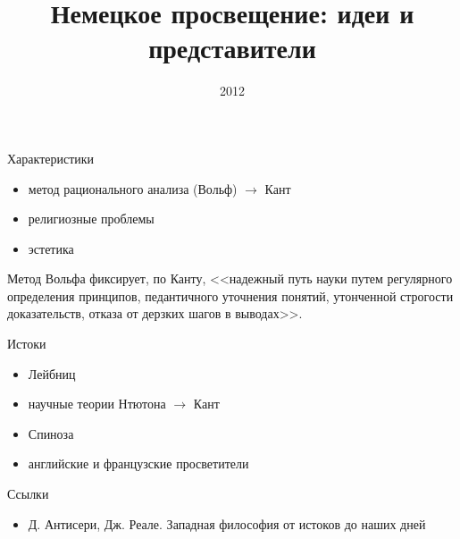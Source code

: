\documentclass{beamer}
\title[Немецкое просвещение]{Немецкое просвещение: идеи и представители}
\date{2012}
\begin{document}
    \begin{frame}
        \titlepage
    \end{frame}

    \begin{frame}{Характеристики}
        \begin{itemize}
        \item метод рационального анализа (Вольф) $\rightarrow$ Кант
        \item религиозные проблемы
        \item эстетика
        \end{itemize}
        Метод Вольфа фиксирует, по Канту,
        <<надежный путь науки путем регулярного определения принципов,
        педантичного уточнения понятий, утонченной строгости доказательств,
        отказа от дерзких шагов в выводах>>.
    \end{frame}

    \begin{frame}{Истоки}
        \begin{itemize}
        \item Лейбниц
        \item научные теории Нтютона $\rightarrow$ Кант
        \item Спиноза
        \item английские и французские просветители
        \end{itemize}
    \end{frame}

    \begin{frame}{Ссылки}
        \begin{itemize}
        \item Д. Антисери, Дж. Реале.
            Западная философия от истоков до наших дней
        \end{itemize}
    \end{frame}
\end{document}
